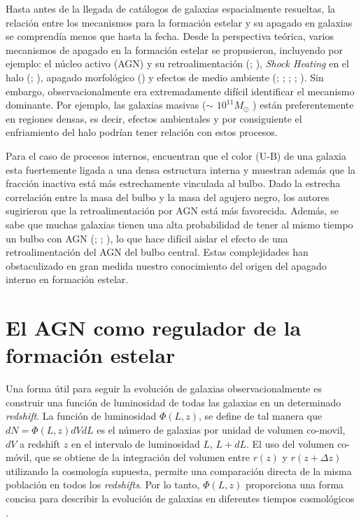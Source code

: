 Hasta antes de la llegada de catálogos de galaxias espacialmente resueltas, la relación entre los mecanismos para la formación estelar y su apagado en galaxias se comprendía menos que hasta la fecha. Desde la perspectiva teórica, varios mecanismos de apagado en la formación estelar se propusieron, incluyendo por ejemplo:  el núcleo activo (AGN) y su retroalimentación (\cite{croton2006}; \cite{Hopkins2006}), \textsl{Shock Heating} en el halo (\cite{dekel2006}; \cite{cattaneo2006}), apagado  morfológico (\cite{martig2009}) y efectos de medio ambiente (\cite{gunn1972}; \cite{toomre1972}; \cite{moore1996}; \cite{bosselli2006}; \cite{weinmann2009}). Sin embargo, observacionalmente era extremadamente difícil identificar el mecanismo dominante. Por ejemplo, las galaxias masivas ($\sim$ $10^{11} M_{\odot}$ ) están preferentemente en regiones densas, es decir, efectos ambientales y por consiguiente el enfriamiento del halo podrían tener relación con estos procesos.

\bigskip


\noindent Para el caso de procesos internos, \citep{bluck2014} encuentran que el color (U-B) de una galaxia esta fuertemente ligada a una densa estructura interna y muestran además que la fracción inactiva está más estrechamente vinculada al bulbo. Dado la estrecha correlación entre la masa del bulbo y la masa del agujero negro, los autores sugirieron que la retroalimentación por AGN está más favorecida. Además, se sabe que muchas galaxias tienen una alta probabilidad de tener al mismo tiempo un bulbo con  AGN (\cite{kaufmann2006}; \cite{heckman2004}; \cite{schawinski2014}), lo que hace difícil aislar el efecto de una retroalimentación del AGN del bulbo central. Estas complejidades han obstaculizado en gran medida nuestro conocimiento del origen del apagado interno en formación estelar.

\section{El AGN como regulador de la formación estelar}

\noindent Una forma útil para seguir la evolución de galaxias observacionalmente es construir una función de luminosidad de todas las galaxias en un determinado \textsl{redshift}. La función de luminosidad $\Phi(L, z)$, se define de tal manera que $dN=\Phi(L, z) dVdL$ es el número de  galaxias por unidad de volumen co-movil, $dV$ a redshift $z$ en el intervalo de luminosidad
$L$, $L + dL$. El uso del volumen co-móvil, que se obtiene de la integración
del volumen entre $r(z)$ y $r(z + \Delta z)$ utilizando la cosmología supuesta, permite
una comparación directa de la misma población  en todos los \textsl{redshifts}.
Por lo tanto, $\Phi(L, z)$ proporciona una forma concisa para describir la evolución de galaxias en diferentes
tiempos cosmológicos \citep{kennicutt1998}.

